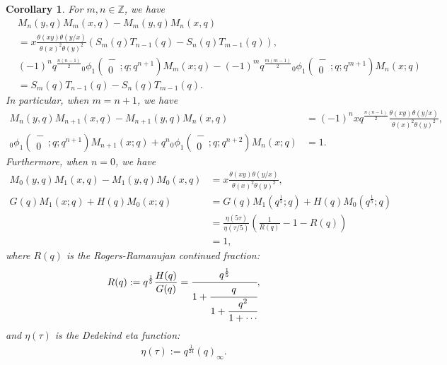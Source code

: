 \documentclass[a4paper]{article}
\newcommand{\Zz}{\mathbb{Z}}
\newcommand{\hyper}[4]{\left( \begin{matrix} #1 \\ #2 \end{matrix};#3;#4\right)}
\numberwithin{equation}{section}
\theoremstyle{plain}
\newtheorem{coro}{Corollary}
\begin{document}
\begin{coro}
\label{thm: lmu identities}
For $m, n\in\Zz$, we have 
 \begin{align}
 &M_n(y,q)M_m(x,q)-M_m(y,q)M_n(x,q)\nonumber \\
 &=x\frac{\theta(xy)\theta(y/x)}{\theta(x)^2\theta(y)^2}(S_m(q)T_{n-1}(q)-S_n(q)T_{m-1}(q))
  , \\
 &(-1)^nq^\frac{n(n-1)}{2}{}_0\phi_1\hyper{-}{0}{q}{q^{n+1}}M_m(x;q)-(-1)^mq^\frac{m(m-1)}{2}{}_0\phi_1\hyper{-}{0}{q}{q^{m+1}}M_n(x;q)
   \nonumber \\
 \label{eq: Wronskian relation}
 &=S_{m}(q)T_{n-1}(q)-S_n(q)T_{m-1}(q). 
 \end{align}
In particular, when $m=n+1$, we have 
 \begin{align}
 M_n(y,q)M_{n+1}(x,q)-M_{n+1}(y,q)M_n(x,q)
   &=
   (-1)^{n}xq^\frac{n(n-1)}{2}\frac{\theta(xy)\theta(y/x)}{\theta(x)^2\theta(y)^2}
   , \\
 \label{eq: n-Wronskian relation}
 {}_0\phi_1\hyper{-}{0}{q}{q^{n+1}}M_{n+1}(x;q)+q^n{}_0\phi_1\hyper{-}{0}{q}{q^{n+2}}M_n(x;q)
   &=1. 
 \end{align}
Furthermore, when $n=0$, we have
\begin{align}
M_0(y,q)M_1(x,q)-M_1(y,q)M_0(x,q)
  &=
  x\frac{\theta(xy)\theta(y/x)}{\theta(x)^2\theta(y)^2}
  ,
  \\
G(q)M_1(x;q)+H(q)M_{0}(x;q)
  &=
  G(q)M_1\left(q^\frac{1}{5};q\right)+H(q)M_{0}\left(q^\frac{1}{5};q\right)
  \nonumber \\
  &=
  \frac{\eta(5\tau)}{\eta(\tau/5)}\left(\frac{1}{R(q)}-1-R(q)\right)
  \nonumber \\
\label{eq: RR and little mu}
  &=
  1, 
\end{align}
where $R(q)$ is the Rogers-Ramanujan continued fraction: 
$$R(q):=q^\frac{1}{5}\frac{H(q)}{G(q)}=\cfrac{q^\frac{1}{5}}{1+\cfrac{q}{1+\cfrac{q^2}{1+\cdots}}}, $$
and $\eta(\tau)$ is the Dedekind eta function: 
\begin{align*}
\eta(\tau):=q^\frac{1}{24}(q)_\infty. 
\end{align*}
\end{coro}
\end{document}
